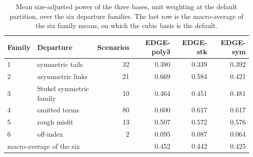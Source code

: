 \begin{table}[htbp]\centering\small
\caption{Mean size-adjusted power of the three bases, unit weighting at the default partition, over
the six departure families. The last row is the macro-average of
the six family means, on which the cubic basis is the default.}
\label{tab:families}
\setlength{\tabcolsep}{4pt}
\begin{tabular}{llrrrr}\hline
Family & Departure & Scenarios & EDGE-poly3 & EDGE-stk & EDGE-sym \\ \hline
1 & symmetric tails & 32 & 0.380 & 0.339 & 0.392 \\
2 & asymmetric links & 21 & 0.669 & 0.584 & 0.421 \\
3 & Stukel symmetric family & 10 & 0.464 & 0.451 & 0.481 \\
4 & omitted terms & 80 & 0.600 & 0.617 & 0.617 \\
5 & rough misfit & 13 & 0.507 & 0.572 & 0.576 \\
6 & off-index & 2 & 0.095 & 0.087 & 0.064 \\
\hline
\multicolumn{3}{l}{macro-average of the six} & 0.452 & 0.442 & 0.425 \\
\hline\end{tabular}\end{table}
